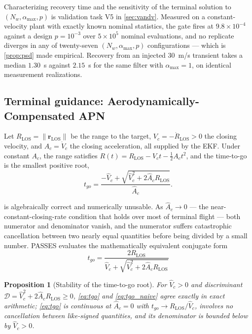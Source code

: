 \documentclass[11pt,a4paper]{article}
\newtheorem{proposition}[theorem]{Proposition}
\theoremstyle{definition}
\numberwithin{equation}{section}
\begin{document}
Characterizing recovery time and the sensitivity of the terminal solution to $(N_w, \alpha_{\max}, p)$ is validation task V5 in \cref{sec:vandv}. Measured on a constant-velocity plant with exactly known nominal statistics, the gate fires at $9.8\times10^{-4}$ against a design $p = 10^{-3}$ over $5\times10^{5}$ nominal evaluations, and no replicate diverges in any of twenty-seven $(N_w,\alpha_{\max},p)$ configurations --- which is \cref{prop:psd} made empirical. Recovery from an injected $30$~m/s transient takes a median $1.30$~s against $2.15$~s for the same filter with $\alpha_{\max}=1$, on identical measurement realizations.

\subsection{Terminal guidance: Aerodynamically-Compensated APN}
\label{sec:apn}

Let $R_{\text{LOS}} = \|\mathbf{r}_{\text{LOS}}\|$ be the range to the target, $V_c = -\dot{R}_{\text{LOS}} > 0$ the closing velocity, and $A_c = \dot{V}_c$ the closing acceleration, all supplied by the EKF. Under constant $A_c$, the range satisfies $R(t) = R_{\text{LOS}} - V_c t - \tfrac{1}{2}A_c t^2$, and the time-to-go is the smallest positive root,
\begin{equation}
\label{eq:tgo_naive}
t_{go} = \frac{-\hat{V}_c + \sqrt{\hat{V}_c^2 + 2\hat{A}_c R_{\text{LOS}}}}{\hat{A}_c}.
\end{equation}

 is algebraically correct and numerically unusable. As $\hat{A}_c \to 0$ --- the near-constant-closing-rate condition that holds over most of terminal flight --- both numerator and denominator vanish, and the numerator suffers catastrophic cancellation between two nearly equal quantities before being divided by a small number. PASSES evaluates the mathematically equivalent conjugate form
\begin{equation}
\label{eq:tgo}
\boxed{\;
t_{go} = \frac{2 R_{\text{LOS}}}{\hat{V}_c + \sqrt{\hat{V}_c^2 + 2\hat{A}_c R_{\text{LOS}}}}
\;}
\end{equation}

\begin{proposition}[Stability of the time-to-go root]
\label{prop:tgo}
For $\hat{V}_c > 0$ and discriminant $\mathcal{D} = \hat{V}_c^2 + 2\hat{A}_c R_{\text{LOS}} \ge 0$, \cref{eq:tgo} and \cref{eq:tgo_naive} agree exactly in exact arithmetic; \cref{eq:tgo} is continuous at $\hat{A}_c = 0$ with $t_{go} \to R_{\text{LOS}}/\hat{V}_c$, involves no cancellation between like-signed quantities, and its denominator is bounded below by $\hat{V}_c > 0$.
\end{proposition}
\end{document}
